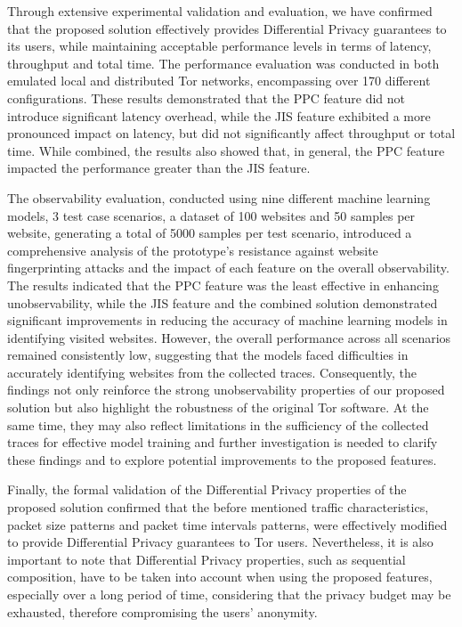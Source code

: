 Through extensive experimental validation and evaluation, we have confirmed that the proposed solution effectively provides Differential Privacy guarantees to its users, while maintaining acceptable performance levels in terms of latency, throughput and total time. The performance evaluation was conducted in both emulated local and distributed Tor networks, encompassing over 170 different configurations. These results demonstrated that the PPC feature did not introduce significant latency overhead, while the JIS feature exhibited a more pronounced impact on latency, but did not significantly affect throughput or total time. While combined, the results also showed that, in general, the PPC feature impacted the performance greater than the JIS feature. 

The observability evaluation, conducted using nine different machine learning models, 3 test case scenarios, a dataset of 100 websites and 50 samples per website, generating a total of 5000 samples per test scenario, introduced a comprehensive analysis of the prototype's resistance against website fingerprinting attacks and the impact of each feature on the overall observability. The results indicated that the PPC feature was the least effective in enhancing unobservability, while the JIS feature and the combined solution demonstrated significant improvements in reducing the accuracy of machine learning models in identifying visited websites. However, the overall performance across all scenarios remained consistently low, suggesting that the models faced difficulties in accurately identifying websites from the collected traces. Consequently, the findings not only reinforce the strong unobservability properties of our proposed solution but also highlight the robustness of the original Tor software. At the same time, they may also reflect limitations in the sufficiency of the collected traces for effective model training and further investigation is needed to clarify these findings and to explore potential improvements to the proposed features. 

Finally, the formal validation of the Differential Privacy properties of the proposed solution confirmed that the before mentioned traffic characteristics, packet size patterns and packet time intervals patterns, were effectively modified to provide Differential Privacy guarantees to Tor users. Nevertheless, it is also important to note that Differential Privacy properties, such as sequential composition, have to be taken into account when using the proposed features, especially over a long period of time, considering that the privacy budget may be exhausted, therefore compromising the users' anonymity.

